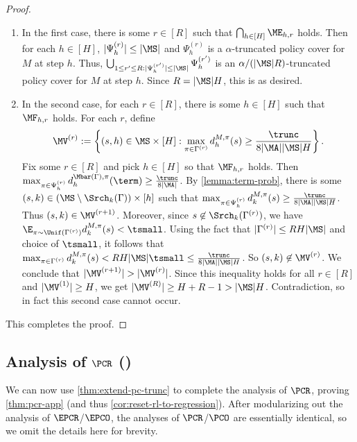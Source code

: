 \begin{proof}
\begin{enumerate}
\item In the first case, there is some $r \in [R]$ such that $\bigcap_{h \in [H]} \ME_{h,r}$ holds. Then for each $h \in [H]$, $|\Psi_h^{(r)}| \leq |\MS|$ and $\Psi_h^{(r)}$ is a $\alpha$-truncated policy cover for $M$ at step $h$. Thus, $\bigcup_{1 \leq r' \leq R: |\Psi_h^{(r')}| \leq |\MS|} \Psi_h^{(r')}$ is an $\alpha/(|\MS|R)$-truncated policy cover for $M$ at step $h$. Since $R = |\MS|H$, this is as desired.
\item In the second case, for each $r \in [R]$, there is some $h \in [H]$ such that $\MF_{h,r}$ holds. For each $r$, define
\[\MV^{(r)} := \left\{(s,h) \in \MS\times[H]: \max_{\pi\in\Gamma^{(r)}} d^{M,\pi}_h(s) \geq \frac{\trunc}{8|\MA||\MS|H}\right\}.\]
Fix some $r \in [R]$ and pick $h \in [H]$ so that $\MF_{h,r}$ holds. Then $\max_{\pi \in \Psi_{h}^{(r)}} d^{\Mbar(\Gamma),\pi}_h(\term) \geq \frac{\trunc}{8|\MA|}$. By \cref{lemma:term-prob}, there is some $(s,k) \in (\MS\setminus \Srch_k(\Gamma))\times[h]$ such that $\max_{\pi\in\Psi_h^{(r)}} d^{M,\pi}_k(s) \geq \frac{\trunc}{8|\MA||\MS|H}$. Thus $(s,k) \in \MV^{(r+1)}$. Moreover, since $s \not \in \Srch_k(\Gamma^{(r)})$, we have $\E_{\pi\sim\Unif(\Gamma^{(r)})} d^{M,\pi}_k(s) < \tsmall$. Using the fact that $|\Gamma^{(r)}| \leq RH|\MS|$ and choice of $\tsmall$, it follows that $\max_{\pi\in\Gamma^{(r)}} d^{M,\pi}_k(s) < RH|\MS|\tsmall \leq \frac{\trunc}{8|\MA||\MS|H}$. So $(s,k) \not \in \MV^{(r)}$. We conclude that $|\MV^{(r+1)}| > |\MV^{(r)}|$. Since this inequality holds for all $r \in [R]$ and $|\MV^{(1)}| \geq H$, we get $|\MV^{(R)}| \geq H + R - 1 > |\MS|H$. Contradiction, so in fact this second case cannot occur.
\end{enumerate}
This completes the proof.
\end{proof}
\fi

\subsection{Analysis of $\PCR$ ()}\label{sec:pcr-analysis}

We can now use \cref{thm:extend-pc-trunc} to complete the analysis of $\PCR$, proving \cref{thm:pcr-app} (and thus \cref{cor:reset-rl-to-regression}). After modularizing out the analysis of $\EPCR$/$\EPCO$, the analyses of $\PCR$/$\PCO$ are essentially identical, so we omit the details here for brevity.

\vspace{1em}


